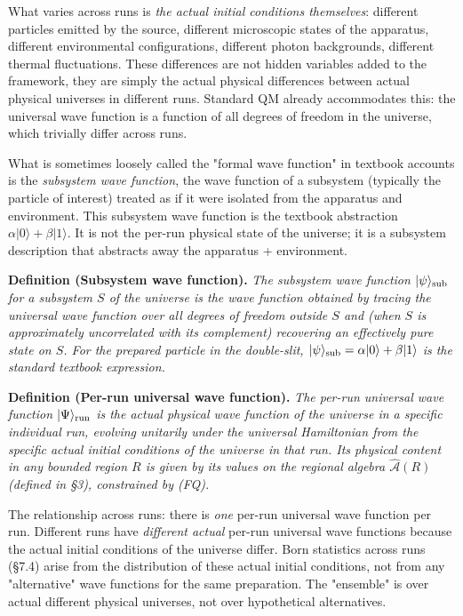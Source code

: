 \documentclass[11pt,a4paper]{article}
\begin{document}
What varies across runs is \emph{the actual initial conditions themselves}: different particles emitted by the source, different microscopic states of the apparatus, different environmental configurations, different photon backgrounds, different thermal fluctuations. These differences are not hidden variables added to the framework, they are simply the actual physical differences between actual physical universes in different runs. Standard QM already accommodates this: the universal wave function is a function of all degrees of freedom in the universe, which trivially differ across runs.

What is sometimes loosely called the "formal wave function" in textbook accounts is the \emph{subsystem wave function}, the wave function of a subsystem (typically the particle of interest) treated as if it were isolated from the apparatus and environment. This subsystem wave function is the textbook abstraction $\alpha|0\rangle + \beta|1\rangle$. It is not the per-run physical state of the universe; it is a subsystem description that abstracts away the apparatus + environment.

\textbf{Definition (Subsystem wave function).} \emph{The subsystem wave function $|\psi\rangle_{\rm sub}$ for a subsystem $S$ of the universe is the wave function obtained by tracing the universal wave function over all degrees of freedom outside $S$ and (when $S$ is approximately uncorrelated with its complement) recovering an effectively pure state on $S$. For the prepared particle in the double-slit, $|\psi\rangle_{\rm sub} = \alpha|0\rangle + \beta|1\rangle$ is the standard textbook expression.}

\textbf{Definition (Per-run universal wave function).} \emph{The per-run universal wave function $|\Psi\rangle_{\rm run}$ is the actual physical wave function of the universe in a specific individual run, evolving unitarily under the universal Hamiltonian from the specific actual initial conditions of the universe in that run. Its physical content in any bounded region $R$ is given by its values on the regional algebra $\hat{\mathcal{A}}(R)$ (defined in §3), constrained by (FQ).}

The relationship across runs: there is \emph{one} per-run universal wave function per run. Different runs have \emph{different actual} per-run universal wave functions because the actual initial conditions of the universe differ. Born statistics across runs (§7.4) arise from the distribution of these actual initial conditions, not from any "alternative" wave functions for the same preparation. The "ensemble" is over actual different physical universes, not over hypothetical alternatives.
\end{document}
